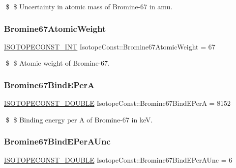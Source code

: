 \$ \$ Uncertainty in atomic mass of Bromine-\/67 in amu. \mbox{\label{group___isotope_const-_bromine-_br67_ga37188ff4e5e40f5c410fe839e5f37e89}} 
\subsubsection{\texorpdfstring{Bromine67\+Atomic\+Weight}{Bromine67AtomicWeight}}
{\footnotesize\ttfamily \mbox{\hyperlink{group___isotope_const-_macros_ga5f18360b3e99483a35c32d789e62621c}{I\+S\+O\+T\+O\+P\+E\+C\+O\+N\+S\+T\+\_\+\+I\+NT}} Isotope\+Const\+::\+Bromine67\+Atomic\+Weight = 67}

\$ \$ Atomic weight of Bromine-\/67. \mbox{\label{group___isotope_const-_bromine-_br67_ga09239e1d161950a16f5ce8e74e65bd11}} 
\subsubsection{\texorpdfstring{Bromine67\+Bind\+E\+PerA}{Bromine67BindEPerA}}
{\footnotesize\ttfamily \mbox{\hyperlink{group___isotope_const-_macros_ga8f45a7272ce02c0b4c65c44636ed719a}{I\+S\+O\+T\+O\+P\+E\+C\+O\+N\+S\+T\+\_\+\+D\+O\+U\+B\+LE}} Isotope\+Const\+::\+Bromine67\+Bind\+E\+PerA = 8152}

\$ \$ Binding energy per A of Bromine-\/67 in keV. \mbox{\label{group___isotope_const-_bromine-_br67_ga8f1b45f7d4770e7ca11c41f2e57fae4d}} 
\subsubsection{\texorpdfstring{Bromine67\+Bind\+E\+Per\+A\+Unc}{Bromine67BindEPerAUnc}}
{\footnotesize\ttfamily \mbox{\hyperlink{group___isotope_const-_macros_ga8f45a7272ce02c0b4c65c44636ed719a}{I\+S\+O\+T\+O\+P\+E\+C\+O\+N\+S\+T\+\_\+\+D\+O\+U\+B\+LE}} Isotope\+Const\+::\+Bromine67\+Bind\+E\+Per\+A\+Unc = 6}

